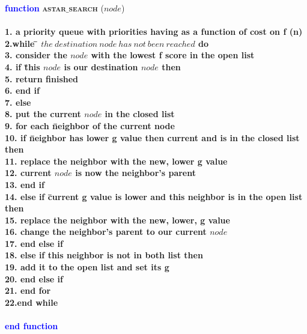 \documentclass{article}
\begin{document}
\begin{center}
\begin{tabbing}
\large
\indent\textbf{\textcolor{blue}{func}}\=\textbf{\textcolor{blue}{tion}}
\textsc{\bfseries{astar$\_$search}}{ ($node$)}\\\\
\bfseries{1.}\indent \> a priority queue with
priorities having as a function of cost on f (n) \\
\bfseries{2.}\indent \>\textbf{while} \= $ the\ destination\ node\ has\ not\ been\ reached $ \textbf{ do}\\
\bfseries{3.}\indent \> consider the $node$ with the lowest f score \textbf{in} the open list\\
\bfseries{4.}\indent\>   \> \textbf{if} \= this $node$ is our destination $node$ \textbf{then}\\
\bfseries{5.}\indent\>    \>  \>\textbf{return } finished\\
\bfseries{6.}\indent\>    \> \textbf{end if}\\
\bfseries{7.}\indent\>    \> \textbf{else }\\
\bfseries{8.}\indent\>    \> \> put the current $node$ in the closed list\\
\bfseries{9.}\indent\>    \> \>\textbf{for each} \= neighbor of the current node \\
\bfseries{10.}\indent\>   \>\>\>\textbf{if} \= neighbor has lower g value then current and is in the closed list \textbf{then}\\
\bfseries{11.}\indent\>   \>\>\>\> replace the neighbor with the new, lower g value\\
\bfseries{12.}\indent\>   \>\>\>\> current $node$ is now the neighbor's parent\\
\bfseries{13.}\indent\>   \>\>\>\textbf{end if}\\
\bfseries{14.}\indent\>   \>\>\>\textbf{else if} \= current g value is lower and this neighbor is in the open list \textbf{then}\\
\bfseries{15.}\indent\>    \>\>\>\>replace the neighbor with the new, lower, g value\\
\bfseries{16.}\indent\>     \>\>\>\>change the neighbor's parent to our current $node$\\
\bfseries{17.}\indent\>   \>\>\>\textbf{end else if}\\
\bfseries{18.}\indent\>   \>\>\>\textbf{else if} this neighbor is not in both list \textbf{then}\\
\bfseries{19.}\indent\>     \>\>\>\>\textbf{add} it to the open list and set its g\\
\bfseries{20.}\indent\>   \>\>\>\textbf{end else if}\\
\bfseries{21.}\indent\>    \> \>\textbf{end for}\\
\bfseries{22.}\indent \>\textbf{end while}\\\\
\indent\textbf{\textcolor{blue}{end }}\=\textbf{\textcolor{blue}{function}}
\end{tabbing}
\end{center}
\end{document}
